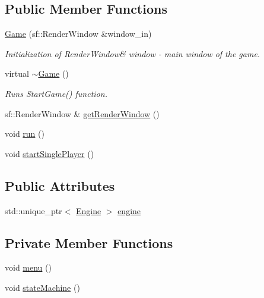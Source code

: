 \subsection*{Public Member Functions}
\begin{DoxyCompactItemize}
\item 
\hyperlink{class_game_a0010695fcd27f6fc91b37b5cf3ed0543}{Game} (sf\+::\+Render\+Window \&window\+\_\+in)
\begin{DoxyCompactList}\small\item\em Initialization of Render\+Window\& window -\/ main window of the game. \end{DoxyCompactList}\item 
virtual \hyperlink{class_game_ae3d112ca6e0e55150d2fdbc704474530}{$\sim$\+Game} ()
\begin{DoxyCompactList}\small\item\em Runs Start\+Game() function. \end{DoxyCompactList}\item 
sf\+::\+Render\+Window \& \hyperlink{class_game_ada9faa2a1f4e1453420adead02fd9865}{get\+Render\+Window} ()
\item 
void \hyperlink{class_game_a1ab78f5ed0d5ea879157357cf2fb2afa}{run} ()
\item 
void \hyperlink{class_game_afbc524f7661c9ce1bea6ca45fd212093}{start\+Single\+Player} ()
\end{DoxyCompactItemize}
\subsection*{Public Attributes}
\begin{DoxyCompactItemize}
\item 
std\+::unique\+\_\+ptr$<$ \hyperlink{class_engine}{Engine} $>$ \hyperlink{class_game_aee6b9ebe224001f736e1ed71a3b28223}{engine}
\end{DoxyCompactItemize}
\subsection*{Private Member Functions}
\begin{DoxyCompactItemize}
\item 
void \hyperlink{class_game_a463932fa7ca2f1ce243279bf2422fc48}{menu} ()
\item 
void \hyperlink{class_game_a8bc94200bfbf0421b83b7c2b2b45da72}{state\+Machine} ()
\end{DoxyCompactItemize}

